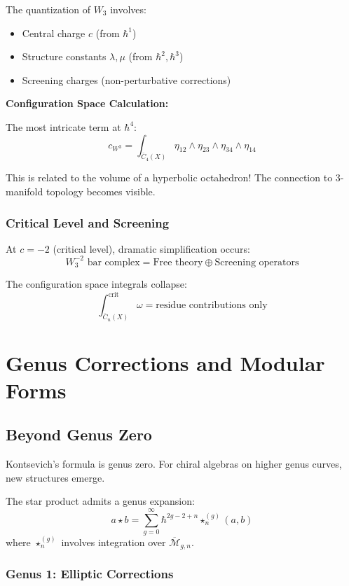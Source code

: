 The quantization of $W_3$ involves:
\begin{itemize}
\item Central charge $c$ (from $\hbar^1$)
\item Structure constants $\lambda, \mu$ (from $\hbar^2, \hbar^3$)
\item Screening charges (non-perturbative corrections)
\end{itemize}

\textbf{Configuration Space Calculation:}

The most intricate term at $\hbar^4$:
$$c_{W^3} = \int_{\overline{C}_4(X)} \eta_{12} \wedge \eta_{23} \wedge \eta_{34} \wedge \eta_{14}$$

This is related to the volume of a hyperbolic octahedron! The connection to 3-manifold topology becomes visible.

\subsubsection{Critical Level and Screening}

At $c = -2$ (critical level), dramatic simplification occurs:
$$W_3^{-2} \text{ bar complex} = \text{Free theory} \oplus \text{Screening operators}$$

The configuration space integrals collapse:
$$\int_{\overline{C}_n(X)}^{\text{crit}} \omega = \text{residue contributions only}$$

\section{Genus Corrections and Modular Forms}

\subsection{Beyond Genus Zero}

Kontsevich's formula is genus zero. For chiral algebras on higher genus curves, new structures emerge.

\begin{theorem}
The star product admits a genus expansion:
$$a \star b = \sum_{g=0}^\infty \hbar^{2g-2+n} \star^{(g)}_n(a,b)$$
where $\star^{(g)}_n$ involves integration over $\overline{\mathcal{M}}_{g,n}$.
\end{theorem}

\subsubsection{Genus 1: Elliptic Corrections}

